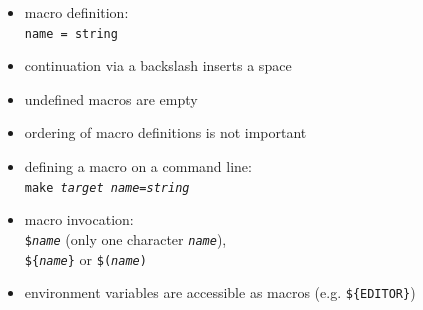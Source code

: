 \begin{slide}
\begin{itemize}
\item macro definition:\\
\hspace*{5em}\texttt{name = string}
\item continuation via a backslash inserts a space
\item undefined macros are empty
\item ordering of macro definitions is not important
\item defining a macro on a command line: \\
\hspace*{5em}\texttt{make \emph{target} \emph{name}=\emph{string}}
\item macro invocation: \\
\hspace*{5em}\texttt{\$\emph{name}} (only one character
\texttt{\emph{name}}), \\
\hspace*{5em}\texttt{\$\{\emph{name}\}} or \texttt{\$(\emph{name})}
\item environment variables are accessible as macros (e.g. \texttt{\$\{EDITOR\}})
\end{itemize}
\end{slide}

